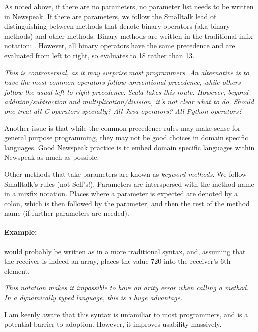 \documentclass{article}
\begin{document}
As noted above, if there are no parameters, no parameter list needs to be written in Newspeak. If there are parameters, we follow the Smalltalk lead of distinguishing between methods that denote binary operators (aka binary methods) and other methods. Binary methods are written in the traditional infix notation: .  However, all binary operators have the same precedence and are evaluated from left to right, so  evaluates to 18 rather than 13. 

{\em This is controversial, as it may surprise most programmers. An alternative is to have the most common operators follow conventional precedence, while others follow the usual left to right precedence. Scala \cite{ScalaBook} takes this route. However, beyond addition/subtraction and multiplication/division, it's not clear what to do. Should one treat all C operators specially? All Java operators? All Python operators? 

Another issue is that while the common precedence rules may make sense for general purpose programming, they may not be good choices in domain specific languages. Good Newspeak practice is to embed domain specific languages within Newspeak as much as possible.
}

Other methods that take parameters are known as {\em keyword methods}. We follow Smalltalk's rules (not Self's!). Parameters are interspersed with the method name in a mixfix notation. Places where a parameter is expected are denoted by a colon, which is then followed by the parameter, and then the rest of the method name (if further parameters are needed).

\paragraph{Example:} 

  would probably be written as   in a more traditional syntax, and, assuming that the receiver is indeed an array, places the value 720 into the receiver's 6th element.



{\em
This notation makes it impossible to have an arity error when calling a method. In a dynamically typed language, this is a huge advantage. 

I am keenly aware that this syntax is unfamiliar to most programmers, and is a potential barrier to adoption. However, it improves usability massively. 
}
\end{document}
